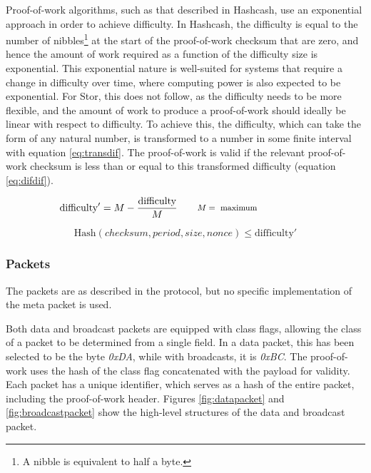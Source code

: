 			Proof-of-work algorithms, such as that described in Hashcash, use an exponential approach in order to achieve difficulty. In Hashcash, the difficulty is equal to the number of nibbles\footnote{A nibble is equivalent to half a byte.} at the start of the proof-of-work checksum that are zero, and hence the amount of work required as a function of the difficulty size is exponential. This exponential nature is well-suited for systems that require a change in difficulty over time, where computing power is also expected to be exponential. For Stor, this does not follow, as the difficulty needs to be more flexible, and the amount of work to produce a proof-of-work should ideally be linear with respect to difficulty. To achieve this, the difficulty, which can take the form of any natural number, is transformed to a number in some finite interval with equation \ref{eq:transdif}. The proof-of-work is valid if the relevant proof-of-work checksum is less than or equal to this transformed difficulty (equation \ref{eq:difdif}).
		
			\begin{equation} \label{eq:transdif}
			\text{difficulty}' = M - \frac{\text{difficulty}}{M}
			\qquad\parbox{4.0cm}{\footnotesize$\begin{aligned} M &= \text{ maximum}\end{aligned}$}
			\end{equation}
			
			\begin{equation} \label{eq:difdif}
			\text{Hash}(checksum, period, size, nonce) \le \text{difficulty}'
			\end{equation}

				
		
		\subsubsection*{Packets}
			The packets are as described in the protocol, but no specific implementation of the meta packet is used.
			
			Both data and broadcast packets are equipped with class flags, allowing the class of a packet to be determined from a single field. In a data packet, this has been selected to be the byte \textit{0xDA}, while with broadcasts, it is \textit{0xBC}. The proof-of-work uses the hash of the class flag concatenated with the payload for validity. Each packet has a unique identifier, which serves as a hash of the entire packet, including the proof-of-work header. Figures \ref{fig:datapacket} and \ref{fig:broadcastpacket} show the high-level structures of the data and broadcast packet.
 			
